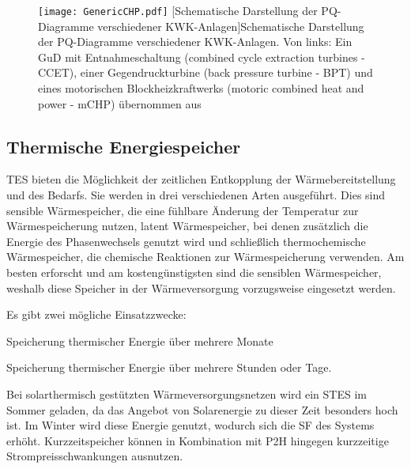 	\begin{figure}[htbp]
		\centering
		\texttt{[image: GenericCHP.pdf]}
		[Schematische Darstellung der PQ-Diagramme verschiedener KWK-Anlagen]{Schematische Darstellung der PQ-Diagramme verschiedener KWK-Anlagen. Von links: Ein \ac{GuD} mit Entnahmeschaltung (combined cycle extraction turbines - CCET), einer Gegendruckturbine (back pressure turbine - BPT) und eines motorischen Blockheizkraftwerks (motoric combined heat and power - mCHP) übernommen aus \cite{oemof2019}}
		\label{fig: PQ-Diagramm}
	\end{figure}

\subsection{Thermische Energiespeicher}

\ac{TES} bieten die Möglichkeit der zeitlichen Entkopplung der Wärmebereitstellung und des Bedarfs. Sie werden in drei verschiedenen Arten ausgeführt. Dies sind sensible Wärmespeicher, die eine fühlbare Änderung der Temperatur zur Wärmespeicherung nutzen, latent Wärmespeicher, bei denen zusätzlich die Energie des Phasenwechsels genutzt wird und schließlich thermochemische Wärmespeicher, die chemische Reaktionen zur Wärmespeicherung verwenden. Am besten erforscht und am kostengünstigsten sind die sensiblen Wärmespeicher, weshalb diese Speicher in der Wärmeversorgung vorzugsweise eingesetzt werden. \cite{Sterner2017}

Es gibt zwei mögliche Einsatzzwecke:
	\begin{description}[leftmargin=!,labelwidth=\widthof{\bfseries Saisonale Wärmespeicher}]
		\item[Saisonale Wärmespeicher] Speicherung thermischer Energie über mehrere Monate
		\item[Kurzzeitspeicher] Speicherung thermischer Energie über mehrere Stunden oder Tage.
	\end{description}
Bei solarthermisch gestützten Wärmeversorgungsnetzen wird ein \ac{STES} im Sommer geladen, da das Angebot von Solarenergie zu dieser Zeit besonders hoch ist. Im Winter wird diese Energie genutzt, wodurch sich die \ac{SF} des Systems erhöht. Kurzzeitspeicher können in Kombination mit \ac{P2H} hingegen kurzzeitige Strompreisschwankungen ausnutzen.

